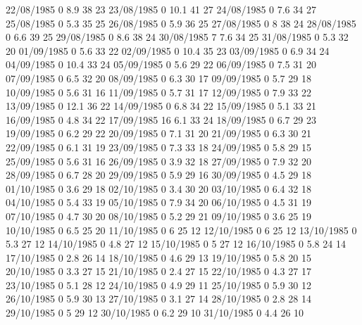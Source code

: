 22/08/1985  0      8.9    38     23 
23/08/1985  0      10.1   41     27 
24/08/1985  0      7.6    34     27 
25/08/1985  0      5.3    35     25 
26/08/1985  0      5.9    36     25 
27/08/1985  0      8      38     24 
28/08/1985  0      6.6    39     25 
29/08/1985  0      8.6    38     24 
30/08/1985  7      7.6    34     25 
31/08/1985  0      5.3    32     20 
01/09/1985  0      5.6    33     22 
02/09/1985  0      10.4   35     23 
03/09/1985  0      6.9    34     24 
04/09/1985  0      10.4   33     24 
05/09/1985  0      5.6    29     22 
06/09/1985  0      7.5    31     20 
07/09/1985  0      6.5    32     20 
08/09/1985  0      6.3    30     17 
09/09/1985  0      5.7    29     18 
10/09/1985  0      5.6    31     16 
11/09/1985  0      5.7    31     17 
12/09/1985  0      7.9    33     22 
13/09/1985  0      12.1   36     22 
14/09/1985  0      6.8    34     22 
15/09/1985  0      5.1    33     21 
16/09/1985  0      4.8    34     22 
17/09/1985  16     6.1    33     24 
18/09/1985  0      6.7    29     23 
19/09/1985  0      6.2    29     22 
20/09/1985  0      7.1    31     20 
21/09/1985  0      6.3    30     21 
22/09/1985  0      6.1    31     19 
23/09/1985  0      7.3    33     18 
24/09/1985  0      5.8    29     15 
25/09/1985  0      5.6    31     16 
26/09/1985  0      3.9    32     18 
27/09/1985  0      7.9    32     20 
28/09/1985  0      6.7    28     20 
29/09/1985  0      5.9    29     16 
30/09/1985  0      4.5    29     18 
01/10/1985  0      3.6    29     18 
02/10/1985  0      3.4    30     20 
03/10/1985  0      6.4    32     18 
04/10/1985  0      5.4    33     19 
05/10/1985  0      7.9    34     20 
06/10/1985  0      4.5    31     19 
07/10/1985  0      4.7    30     20 
08/10/1985  0      5.2    29     21 
09/10/1985  0      3.6    25     19 
10/10/1985  0      6.5    25     20 
11/10/1985  0      6      25     12 
12/10/1985  0      6      25     12 
13/10/1985  0      5.3    27     12 
14/10/1985  0      4.8    27     12 
15/10/1985  0      5      27     12 
16/10/1985  0      5.8    24     14 
17/10/1985  0      2.8    26     14 
18/10/1985  0      4.6    29     13 
19/10/1985  0      5.8    20     15 
20/10/1985  0      3.3    27     15 
21/10/1985  0      2.4    27     15 
22/10/1985  0      4.3    27     17 
23/10/1985  0      5.1    28     12 
24/10/1985  0      4.9    29     11 
25/10/1985  0      5.9    30     12 
26/10/1985  0      5.9    30     13 
27/10/1985  0      3.1    27     14 
28/10/1985  0      2.8    28     14 
29/10/1985  0      5      29     12 
30/10/1985  0      6.2    29     10 
31/10/1985  0      4.4    26     10 
